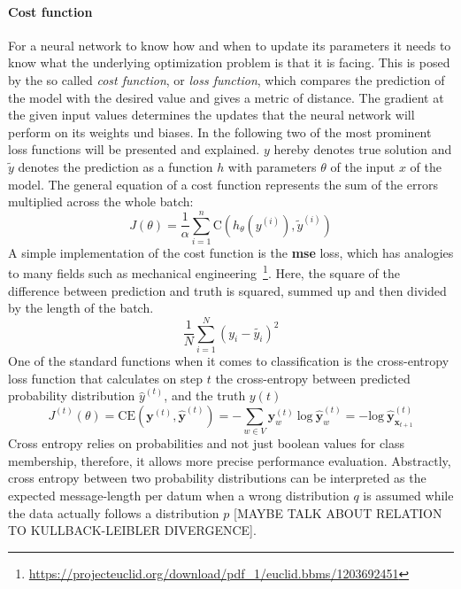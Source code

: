 \paragraph*{Cost function}
For a neural network to know how and when to update its parameters it needs to know what the underlying optimization problem is that it is facing. This is posed by the so called \textit{cost function}, or \textit{loss function}, which compares the prediction of the model with the desired value and gives a metric of distance. The gradient at the given input values determines the updates that the neural network will perform on its weights und biases. In the following two of the most prominent loss functions will be presented and explained. $ y $ hereby denotes true solution and $ \widetilde{y} $ denotes the prediction as a function $ h $ with parameters $ \theta $ of the input $ x $ of the model. The general equation of a cost function represents the sum of the errors multiplied across the whole batch:
\begin{equation}
	J(\theta) = \frac{1}{\alpha} \sum_{i=1}^{n} \text{C} (h_{\theta} (y^{(i)}), \widetilde{y}^{(i)})
\end{equation}
A simple implementation of the cost function is the \textbf{\gls{mse}} loss, which has analogies to many fields such as mechanical engineering~\footnote{\url{https://projecteuclid.org/download/pdf_1/euclid.bbms/1203692451}}. Here, the square of the difference between prediction and truth is squared, summed up and then divided by the length of the batch.
\begin{equation}
	\frac{1}{N} \sum_{i=1}^{N} \left( y_i - \widetilde{y_i} \right)^2
\end{equation}
One of the standard functions when it comes to classification is the cross-entropy loss function that calculates on step $ t $ the cross-entropy between predicted probability distribution $ \hat{y}^{(t)} $, and the truth $ y(t) $
\begin{equation}
	J^{(t)}(\theta) = \text{CE}(\pmb{y}^{(t)}, \hat{\pmb{y}}^{(t)}) = - \sum_{w \in V} \pmb{y}_w^{(t)} \ \text{log} \ \hat{\pmb{y}}_w^{(t)} = - \text{log} \ \hat{\pmb{y}}_{\pmb{x}_{t+1}}^{(t)}
\end{equation}
Cross entropy relies on probabilities and not just boolean values for class membership, therefore, it allows more precise performance evaluation. Abstractly, cross entropy between two probability distributions can be interpreted as the expected message-length per datum when a wrong distribution $ q $ is assumed while the data actually follows a distribution $ p $ [MAYBE TALK ABOUT RELATION TO KULLBACK-LEIBLER DIVERGENCE].

